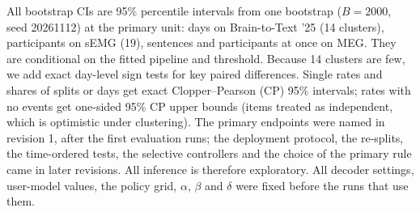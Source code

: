 All bootstrap CIs are 95\% percentile intervals from one bootstrap ($B = 2000$, seed 20261112) at the primary unit: days on Brain-to-Text '25 (14 clusters), participants on sEMG (19), sentences and participants at once on MEG. They are conditional on the fitted pipeline and threshold. Because 14 clusters are few, we add exact day-level sign tests for key paired differences. Single rates and shares of splits or days get exact Clopper--Pearson (CP) 95\% intervals; rates with no events get one-sided 95\% CP upper bounds (items treated as independent, which is optimistic under clustering). The primary endpoints were named in revision 1, after the first evaluation runs; the deployment protocol, the re-splits, the time-ordered tests, the selective controllers and the choice of the primary rule came in later revisions. All inference is therefore exploratory. All decoder settings, user-model values, the policy grid, $\alpha$, $\beta$ and $\delta$ were fixed before the runs that use them.
